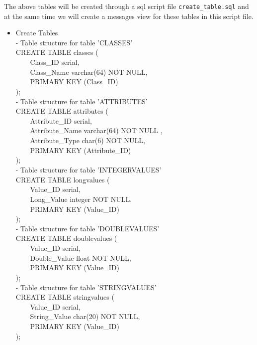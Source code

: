 \documentclass[11pt]{article}
\begin{document}
The above tables will be created through a sql script file \verb+create_table.sql+ and at the same time we will create a messages view for these tables in this script file.
\begin{itemize}
\item Create Tables \\
- Table structure for table 'CLASSES'\\
CREATE TABLE classes (\\
\verb+    +Class\_ID serial,      \\  
\verb+    +Class\_Name varchar(64) NOT NULL,\\
\verb+    +PRIMARY KEY (Class\_ID)\\
);\\

- Table structure for table 'ATTRIBUTES'\\
CREATE TABLE attributes (\\
\verb+    +Attribute\_ID serial,          \\        
\verb+    +Attribute\_Name varchar(64) NOT NULL ,\\
\verb+    +Attribute\_Type char(6) NOT NULL,  \\  
\verb+    +PRIMARY KEY  (Attribute\_ID)\\
);\\

- Table structure for table 'INTEGERVALUES'\\
CREATE TABLE longvalues (\\
\verb+    +Value\_ID serial,				\\		     
\verb+    +Long\_Value integer NOT NULL,\\
\verb+    +PRIMARY KEY  (Value\_ID)\\
);\\

- Table structure for table 'DOUBLEVALUES'\\
CREATE TABLE doublevalues (\\
\verb+    +Value\_ID serial,	 			\\		
\verb+    +Double\_Value float NOT NULL,\\
\verb+    +PRIMARY KEY  (Value\_ID)\\
);\\

- Table structure for table 'STRINGVALUES'\\
CREATE TABLE stringvalues (\\
\verb+    +Value\_ID serial,				\\		
\verb+    +String\_Value char(20)   NOT NULL,\\
\verb+    +PRIMARY KEY  (Value\_ID)\\
);\\


\end{itemize}
\end{document}
